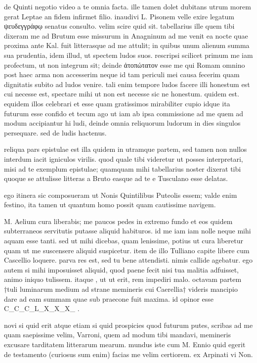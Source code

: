 


 de Quinti negotio video a te omnia facta. ille tamen dolet dubitans utrum morem gerat Leptae an fidem infirmet filio. inaudivi L. Pisonem velle exire legatum ψευδεγγράφῳ senatus consulto. velim scire quid sit. tabellarius ille quem tibi dixeram me ad Brutum esse missurum in Anagninum ad me venit ea nocte quae proxima ante Kal. fuit litterasque ad me attulit; in quibus unum alienum summa sua prudentia, idem illud, ut spectem ludos suos. rescripsi scilicet primum me iam profectum, ut non integrum sit; deinde ἀτοπώτατον esse me qui Romam omnino post haec arma non accesserim neque id tam periculi mei causa fecerim quam dignitatis subito ad ludos venire. tali enim tempore ludos facere illi honestum est cui necesse est, spectare mihi ut non est necesse sic ne honestum. quidem est. equidem illos celebrari et esse quam gratissimos mirabiliter cupio idque ita futurum esse confido et tecum ago ut iam ab ipsa commissione ad me quem ad modum accipiantur hi ludi, deinde omnia reliquorum ludorum in dies singulos persequare. sed de ludis hactenus.

 reliqua pars epistulae est illa quidem in utramque partem, sed tamen non nullos interdum iacit igniculos virilis. quod quale tibi videretur ut posses interpretari, misi ad te exemplum epistulae; quamquam mihi tabellarius noster dixerat tibi quoque se attulisse litteras a Bruto easque ad te e Tusculano esse delatas.

 ego itinera sic composueram ut Nonis Quintilibus Puteolis essem; valde enim festino, ita tamen ut quantum homo possit quam cautissime navigem.

 M. Aelium cura liberabis; me paucos pedes in extremo fundo et eos quidem subterraneos servitutis putasse aliquid habituros. id me iam iam nolle neque mihi aquam esse tanti. sed ut mihi dicebas, quam lenissime, potius ut cura liberetur quam ut me suscensere aliquid suspicetur. item de illo Tulliano capite libere cum Cascellio loquere. parva res est, sed tu bene attendisti. nimis callide agebatur. ego autem si mihi imposuisset aliquid, quod paene fecit nisi tua malitia adfuisset, animo iniquo tulissem. itaque , ut ut erit, rem impediri malo. octavam partem †tuli luminarum medium ad strane memineris cui Caerellia† videris mancipio dare ad eam summam quae sub praecone fuit maxima. id opinor esse C_C_C_L_X_X_X_ .

 novi si quid erit atque etiam si quid prospicies quod futurum putes, scribas ad me quam saepissime velim, Varroni, quem ad modum tibi mandavi, memineris excusare tarditatem litterarum mearum. mundus iste cum M. Ennio quid egerit de testamento (curiosus sum enim) facias me velim certiorem. ex Arpinati vi Non.
